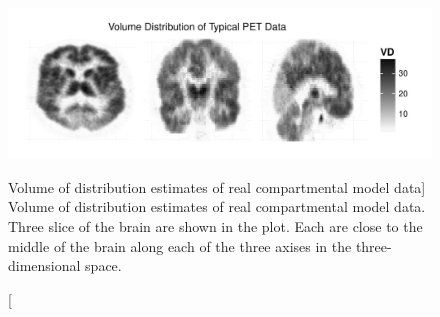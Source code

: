 \begin{figure}[t]
  \UseAltLinespread
  \includegraphics[width=\linewidth]{fig_src/PETPlot-smc2-ps-bw}
  \caption
  [Volume of distribution estimates of real \protect\pet
   compartmental model data]
  {Volume of distribution estimates of real \protect\pet compartmental model data. Three slice of the brain are shown in the plot. Each are close to the middle of the brain along each of the three axises in the three-dimensional space.}
  \label{fig:petplot}
\end{figure}
